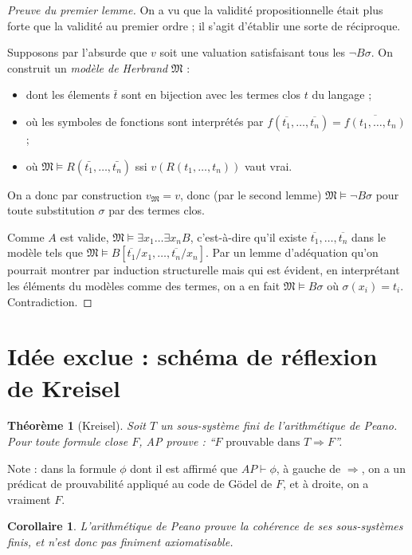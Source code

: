 \documentclass[a4paper, 11pt]{article}
\newtheorem*{theorem}{Théorème}
\newtheorem*{corollary}{Corollaire}
\begin{document}
\begin{proof}[Preuve du premier lemme]
  On a vu que la validité propositionnelle était plus forte que la validité au
  premier ordre ; il s'agit d'établir une sorte de réciproque.

  Supposons par l'absurde que $v$ soit une valuation satisfaisant tous les
  $\lnot B\sigma$. On construit un \emph{modèle de Herbrand} $\mathfrak{M}$ :
  \begin{itemize}
  \item dont les élements $\bar{t}$ sont en bijection avec les termes clos $t$
    du langage ;
  \item où les symboles de fonctions sont interprétés par $f(\overline{t_1}, \ldots,
    \overline{t_n}) = \overline{f(t_1, \ldots, t_n)}$ ;
  \item où $\mathfrak{M} \models R(\bar{t_1}, \ldots, \bar{t_n})$ ssi $v(R(t_1,
    \ldots, t_n))$ vaut vrai.
  \end{itemize}
  On a donc par construction $v_{\mathfrak{M}} = v$, donc (par le second lemme)
  $\mathfrak{M} \models \lnot B\sigma$ pour toute substitution $\sigma$ par des
  termes clos.
  
  Comme $A$ est valide, $\mathfrak{M} \models \exists x_1 \ldots \exists x_n B$,
  c'est-à-dire qu'il existe $\overline{t_1}, \ldots, \overline{t_n}$ dans le
  modèle tels que $\mathfrak{M} \models B[\overline{t_1}/x_1, \ldots,
  \overline{t_n}/x_n]$. Par un lemme d'adéquation qu'on pourrait montrer par
  induction structurelle mais qui est évident, en interprétant les éléments du
  modèles comme des termes, on a en fait $\mathfrak{M} \models B\sigma$ où
  $\sigma(x_i) = t_i$. Contradiction.
\end{proof}

\newpage

\section{Idée exclue : schéma de réflexion de Kreisel}

\begin{theorem}[Kreisel]
  Soit $T$ un sous-système fini de l'arithmétique de Peano. Pour toute formule
  close $F$, AP prouve : \enquote{$F \text{ prouvable dans } T \Rightarrow F$}.
\end{theorem}
Note : dans la formule $\phi$ dont il est affirmé que $AP \vdash \phi$, à gauche
de $\Rightarrow$, on a un prédicat de prouvabilité appliqué au code de Gödel de
$F$, et à droite, on a vraiment $F$.
\begin{corollary}
  L'arithmétique de Peano prouve la cohérence de ses sous-systèmes finis, et
  n'est donc pas finiment axiomatisable.
\end{corollary}
\end{document}
